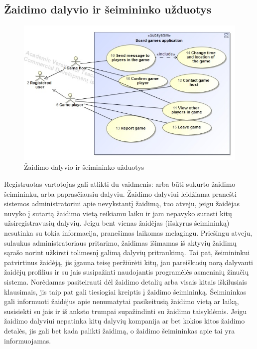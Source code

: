 \documentclass{VUMIFPSkursinis}
\begin{document}
	\subsection{Žaidimo dalyvio ir šeimininko užduotys}
		\begin{figure}[H]
			\centering
			\includegraphics[scale=0.5]{img/UzduociuDiagrama2}
			\caption{Žaidimo dalyvio ir šeimininko užduotys}
			\label{img:UzduociuDiagrama2}
		\end{figure}
		Registruotas vartotojas gali atlikti du vaidmenis: arba būti sukurto žaidimo šeimininku, arba paprasčiausiu dalyviu. Žaidimo dalyviui leidžiama pranešti sistemos administratoriui apie nevykstantį žaidimą, tuo atveju, jeigu žaidėjas nuvyko į sutartą žaidimo vietą reikiamu laiku ir jam nepavyko surasti kitų užsiregistravusių dalyvių. Jeigu bent vienas žaidėjas (išskyrus šeimininką) nesutinka su tokia informacija, pranešimas laikomas melagingu. Priešingu atveju, sulaukus administratoriaus pritarimo, žaidimas išimamas iš aktyvių žaidimų sąrašo norint užkirsti tolimesnį galimą dalyvių pritraukimą. Tai pat, šeimininkui patvirtinus žaidėją, jis įgauna teisę peržiūrėti kitų, jau pareiškusių norą dalyvauti žaidėjų profilius ir su jais susipažinti naudojantis programėlės asmeninių žinučių sistema. Norėdamas pasiteirauti dėl žaidimo detalių arba visais kitais iškilusiais klausimais, jis taip pat gali tiesiogiai kreiptis į žaidimo šeimininką. Šeimininkas gali informuoti žaidėjus apie nenumatytai pasikeitusią žaidimo vietą ar laiką, susisiekti su jais ir iš anksto trumpai supažindinti su žaidimo taisyklėmis. Jeigu žaidimo dalyviui nepatinka kitų dalyvių kompanija ar bet kokios kitos žaidimo detalės, jis gali bet kada palikti žaidimą, o žaidimo šeimininkas apie tai yra informuojamas.
\end{document}
